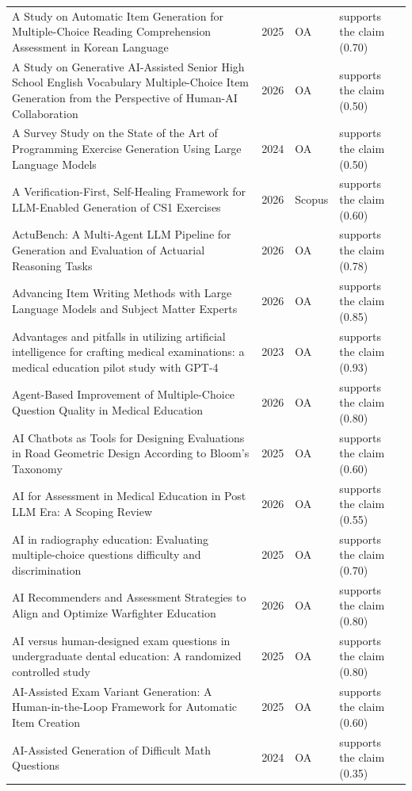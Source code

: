 \begin{longtable}{@{}%
  >{\raggedright\arraybackslash}p{}c%
  >{\raggedright\arraybackslash}p{}%
  >{\raggedright\arraybackslash}p{}@{}}
A Study on Automatic Item Generation for Multiple-Choice Reading Comprehension Assessment in Korean Language & 2025 & OA & supports the claim (0.70) \\
A Study on Generative AI-Assisted Senior High School English Vocabulary Multiple-Choice Item Generation from the Perspective of Human-AI Collaboration & 2026 & OA & supports the claim (0.50) \\
A Survey Study on the State of the Art of Programming Exercise Generation Using Large Language Models & 2024 & OA & supports the claim (0.50) \\
A Verification-First, Self-Healing Framework for LLM-Enabled Generation of CS1 Exercises & 2026 & Scopus & supports the claim (0.60) \\
ActuBench: A Multi-Agent LLM Pipeline for Generation and Evaluation of Actuarial Reasoning Tasks & 2026 & OA & supports the claim (0.78) \\
Advancing Item Writing Methods with Large Language Models and Subject Matter Experts & 2026 & OA & supports the claim (0.85) \\
Advantages and pitfalls in utilizing artificial intelligence for crafting medical examinations: a medical education pilot study with GPT-4 & 2023 & OA & supports the claim (0.93) \\
Agent-Based Improvement of Multiple-Choice Question Quality in Medical Education & 2026 & OA & supports the claim (0.80) \\
AI Chatbots as Tools for Designing Evaluations in Road Geometric Design According to Bloom's Taxonomy & 2025 & OA & supports the claim (0.60) \\
AI for Assessment in Medical Education in Post LLM Era: A Scoping Review & 2026 & OA & supports the claim (0.55) \\
AI in radiography education: Evaluating multiple-choice questions difficulty and discrimination & 2025 & OA & supports the claim (0.70) \\
AI Recommenders and Assessment Strategies to Align and Optimize Warfighter Education & 2026 & OA & supports the claim (0.80) \\
AI versus human-designed exam questions in undergraduate dental education: A randomized controlled study & 2025 & OA & supports the claim (0.80) \\
AI-Assisted Exam Variant Generation: A Human-in-the-Loop Framework for Automatic Item Creation & 2025 & OA & supports the claim (0.60) \\
AI-Assisted Generation of Difficult Math Questions & 2024 & OA & supports the claim (0.35) \\

\end{longtable}
